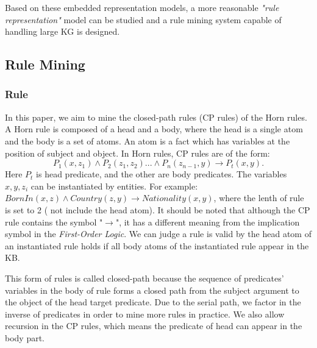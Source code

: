\documentclass{article}
\begin{document}
	Based on these embedded representation models, a more reasonable {\em "rule representation"} model can be studied and a rule mining system capable of handling large KG is designed. 
	
	\subsection{Rule Mining}
	\subsubsection{Rule} In this paper, we aim to mine the closed-path rules (CP rules) of the Horn rules. A Horn rule is composed of a head and a body, where the head is a single atom and the body is a set of atoms. An atom is a fact which has variables at the position of subject and object. In Horn rules, CP rules are of the form: 
	\begin{equation} 
	P_1(x, z_1) \wedge P_2(z_1, z_2)... \wedge P_n(z_{n-1}, y) \to P_t(x, y). 
	 \label{eq:cp rule}
	\end{equation}
	Here $P_t$ is head predicate, and the other are body predicates. The variables $x, y, z_i$ can be instantiated by entities. For example: $BornIn(x, z) \wedge Country(z, y) \to Nationality(x, y)$, where the lenth of rule is set to 2 ( not include the head atom).
	It should be noted that although the CP rule contains the symbol "$\to$", it has a different meaning from the implication symbol in the {\em First-Order Logic}. We can judge a rule is valid by the head atom of an instantiated rule holds if all body atoms of the instantiated rule appear in the KB. 
	
	This form of rules is called closed-path because the sequence of predicates' variables in the body of rule forms a closed path from the subject argument to the object of the head target predicate.
	Due to the serial path, we factor in the inverse of predicates in order to mine more rules in practice. We also allow recursion in the CP rules, which means the predicate of head can appear in the body part.
	
\end{document}
